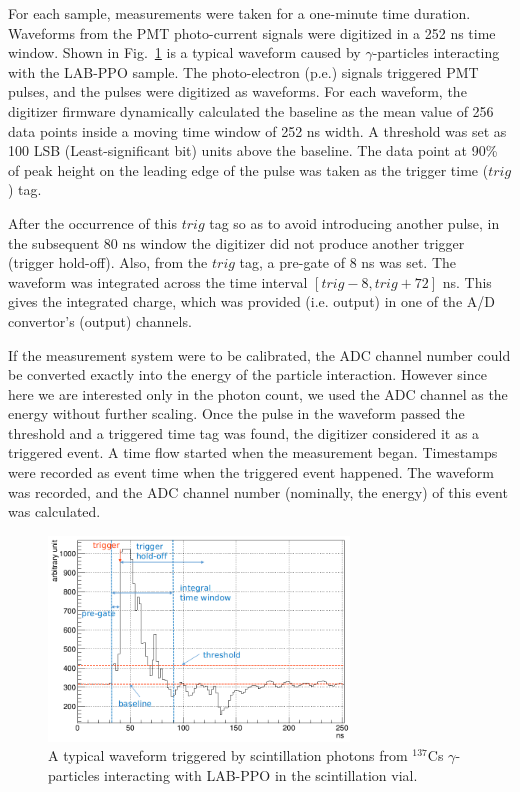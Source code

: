 For each sample, measurements were taken for a one-minute time duration. Waveforms from the PMT photo-current signals were digitized in a 252 ns time window. Shown in Fig.~\ref{teLSwaveform} is a typical waveform caused by $\gamma$-particles interacting with the LAB-PPO sample. The photo-electron (p.e.) signals triggered PMT pulses, and the pulses were digitized as waveforms. For each waveform, the digitizer firmware dynamically calculated the baseline as the mean value of 256 data points inside a moving time window of 252 ns width. A threshold was set as 100 LSB (Least-significant bit) units above the baseline. The data point at 90\% of peak height on the leading edge of the pulse was taken as the trigger time ($trig$) tag.

After the occurrence of this $trig$ tag so as to avoid introducing another pulse, in the subsequent 80 ns window the digitizer did not produce another trigger (trigger hold-off). Also, from the $trig$ tag, a pre-gate of 8 ns was set. The waveform was integrated across the time interval $[trig-8, trig+72]$ ns. This gives the integrated charge, which was provided (i.e. output) in one of the A/D convertor's (output) channels. 

If the measurement system were to be calibrated, the ADC channel number could be converted exactly into the energy of the particle interaction. However since here we are interested only in the photon count, we used the ADC channel as the energy without further scaling. Once the pulse in the waveform passed the threshold and a triggered time tag was found, the digitizer considered it as a triggered event. A time flow started when the measurement began. Timestamps were recorded as event time when the triggered event happened. The waveform was recorded, and the ADC channel number (nominally, the energy) of this event was calculated.

\begin{figure}[htbp]
	\centering	
	\includegraphics[width=8cm]{teLS_waveform.png}
	\caption[A typical triggered waveform.]{A typical waveform triggered by scintillation photons from $^{137}$Cs $\gamma$-particles interacting with LAB-PPO in the scintillation vial.}
	\label{teLSwaveform}
\end{figure}

